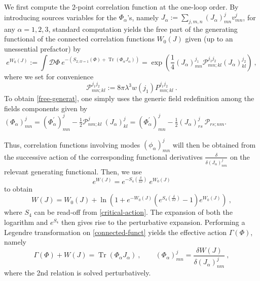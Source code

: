 \documentclass[a4paper,11pt,twoside]{article}
\numberwithin{equation}{section}
\DeclareMathOperator{\tr}{Tr}
\theoremstyle{nonumberplain}
\newcounter{and}
\begin{document}
We first compute the 2-point correlation function at the one-loop order. By introducing sources variables for the $\Phi_\alpha$'s, namely $J_\alpha:=\sum_{j,m,n}(J_\alpha)^j_{mn}v^j_{mn}$, for any $\alpha=1,2,3$, standard computation yields the free part of the generating functional of the connected correlation functions $W_0(J)$ given (up to an unessential prefactor) by%
%
\begin{equation}
e^{W_0(J)} := \int\mathcal{D}\Phi \ e^{-(S_{2;\Omega=1}(\Phi)+\tr(\Phi_\alpha J_\alpha))} 
= \exp\left(\frac{1}{4} (J_\alpha)^{j_1}_{mn} \mathcal{P}^{j_1j_2}_{mn;kl} (J_\alpha)^{j_2}_{kl} \right) \ , \label{free-generat}
\end{equation}
%
where we set for convenience%
%
\begin{equation}
\mathcal{P}^{j_1j_2}_{mn;kl} := 8\pi\lambda^3 w(j_1) P^{j_1j_2}_{mn;kl} \ . \label{source}
\end{equation}
%
To obtain \eqref{free-generat}, one simply uses the generic field redefinition among the fields components given by%
$(\Phi_\alpha)^j_{mn} = (\Phi^\prime_\alpha)_{mn}^j - \frac12 \mathcal{P}^j_{nm;kl}\ (J_\alpha)^j_{kl} = (\Phi^\prime_\alpha)_{mn}^j - \frac12 (J_\alpha)^j_{rs} \ \mathcal{P}_{rs;nm}$.\par%
%
Thus, correlation functions involving modes $(\phi_\alpha)^j_{mn}$ will then be obtained from the successive action of the corresponding functional derivatives $\frac{\delta}{\delta(J_\alpha)^j_{nm}}$ on the relevant generating functional. Then, we use%
%
\begin{equation*}
e^{W(J)} = e^{-S_4\left(\frac{\delta}{\delta{J}}\right)} \ e^{W_0(J)}
\end{equation*}
%
to obtain%
%
\begin{equation}
W(J) = W_0(J) + \ln\left( 1 + e^{-W_0(J)} \left( e^{S_4\left(\frac{\delta}{\delta{J}}\right)} - 1 \right) e^{W_0(J)} \right) \ , \label{connected-funct}
\end{equation}
%
where $S_4$ can be read-off from \eqref{critical-action}. The expansion of both the logarithm and $e^{S_4}$ then gives rise to the perturbative expansion. Performing a Legendre transformation on \eqref{connected-funct} yields the effective action $\Gamma(\Phi)$, namely%
%
\begin{equation}
\Gamma(\Phi) + W(J) = \tr\left( \Phi_\alpha J_\alpha \right) \ , \qquad (\Phi_\alpha)^j_{mn} = \frac{\delta W(J)}{\delta(J_\alpha)^j_{nm}} \ , \label{legendre}
\end{equation}
%
where the 2nd relation is solved perturbatively.\par%
\end{document}
